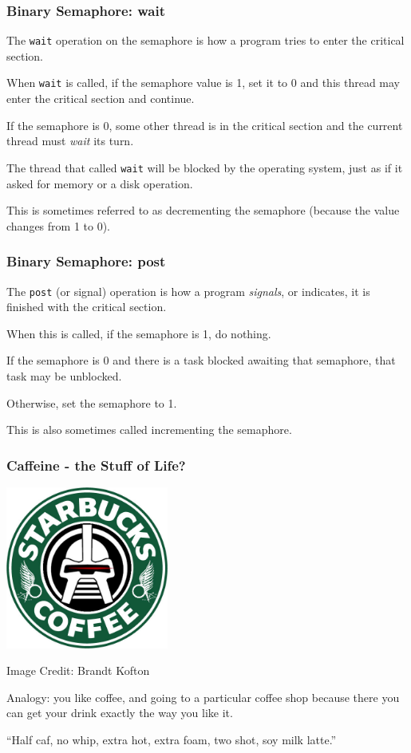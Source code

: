 \begin{frame}
	\frametitle{Binary Semaphore: wait}

	The \texttt{wait} operation on the semaphore is how a program tries to enter the critical section.

	When \texttt{wait} is called, if the semaphore value is 1, set it to 0 and this thread may enter the critical section and continue.

	If the semaphore is 0, some other thread is in the critical section and the current thread must \textit{wait} its turn.

	The thread that called \texttt{wait} will be blocked by the operating system, just as if it asked for memory or a disk operation.

	This is sometimes referred to as decrementing the semaphore (because the value changes from 1 to 0).

\end{frame}

\begin{frame}
	\frametitle{Binary Semaphore: post}

	The \texttt{post} (or signal) operation is how a program \textit{signals}, or indicates, it is finished with the critical section.

	When this is called, if the semaphore is 1, do nothing.

	If the semaphore is 0 and there is a task blocked awaiting that semaphore, that task may be unblocked.

	Otherwise, set the semaphore to 1.

	This is also sometimes called incrementing the semaphore.

\end{frame}

\begin{frame}
	\frametitle{Caffeine - the Stuff of Life?}

	\begin{center}
		\includegraphics[width=0.4\textwidth]{images/starbucks.jpg}
	\end{center}
	\hfill Image Credit: Brandt Kofton


	Analogy: you like coffee, and going to a particular coffee shop because there you can get your drink exactly the way you like it.

	``Half caf, no whip, extra hot, extra foam, two shot, soy milk latte.''

\end{frame}

